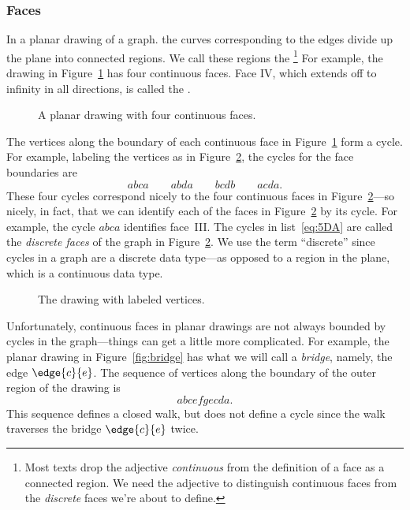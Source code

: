 \subsubsection{Faces}

In a planar drawing of a graph. the curves corresponding to the edges
divide up the plane into connected regions.  We call these regions the
\footnote{Most texts drop the adjective
  \emph{continuous} from the definition of a face as a connected region.
  We need the adjective to distinguish continuous faces from the
  \emph{discrete} faces we're about to define.}  For example, the drawing
in Figure~\ref{fig:continuous-faces} has four continuous faces.  Face IV,
which extends off to infinity in all directions, is called the
.

\begin{figure}


\caption{A planar drawing with four continuous faces.}
\label{fig:continuous-faces}
\end{figure}

The vertices along the boundary of each continuous face in
Figure~\ref{fig:continuous-faces} form a cycle.  For example, labeling the
vertices as in Figure~\ref{fig:continuous-cycles}, the cycles for the face
boundaries are
\begin{equation}\label{eq:5DA}
abca \qquad abda \qquad bcdb \qquad acda.
\end{equation}
These four cycles correspond nicely to the four continuous faces in
Figure~\ref{fig:continuous-cycles}---so nicely, in fact, that we can
identify each of the faces in Figure~\ref{fig:continuous-cycles} by
its cycle.  For example, the cycle $abca$ identifies
face~III\@.  The cycles in list~\ref{eq:5DA} are called the
\emph{discrete faces} of the graph in
Figure~\ref{fig:continuous-cycles}.  We use the term ``discrete''
since cycles in a graph are a discrete data type---as opposed to a
region in the plane, which is a continuous data type.

\begin{figure}


\caption{The drawing with labeled vertices.}
\label{fig:continuous-cycles}
\end{figure}

Unfortunately, continuous faces in planar drawings are not always
bounded by cycles in the graph---things can get a little more
complicated.  For example, the planar drawing in
Figure~\ref{fig:bridge} has what we will call a \emph{bridge}, namely,
the edge $\edge{c}{e}$.  The sequence of vertices along the boundary
of the outer region of the drawing is
\[
abcefgecda.
\]
This sequence defines a closed walk, but does not define a cycle since
the walk traverses the bridge $\edge{c}{e}$ twice.

